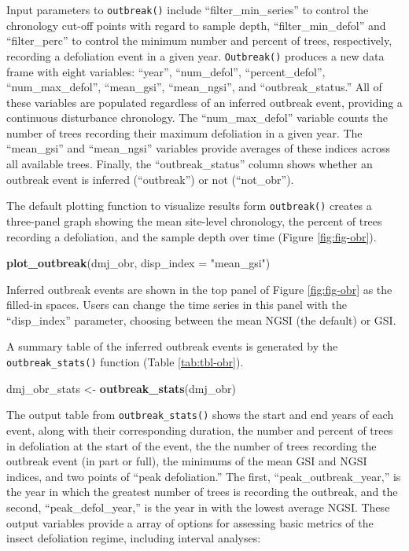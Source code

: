 \documentclass[review]{elsarticle} %
\newenvironment{Shaded}{\begin{snugshade}}{\end{snugshade}}
\newcommand{\DataTypeTok}[1]{\textcolor[rgb]{0.13,0.29,0.53}{#1}}
\newcommand{\KeywordTok}[1]{\textcolor[rgb]{0.13,0.29,0.53}{\textbf{#1}}}
\newcommand{\NormalTok}[1]{#1}
\newcommand{\StringTok}[1]{\textcolor[rgb]{0.31,0.60,0.02}{#1}}
\begin{document}
Input parameters to \texttt{outbreak()} include ``filter\_min\_series'' to control the chronology cut-off points with regard to sample depth, ``filter\_min\_defol'' and ``filter\_perc'' to control the minimum number and percent of trees, respectively, recording a defoliation event in a given year. \texttt{Outbreak()} produces a new data frame with eight variables: ``year'', ``num\_defol'', ``percent\_defol'', ``num\_max\_defol'', ``mean\_gsi'', ``mean\_ngsi'', and ``outbreak\_status.'' All of these variables are populated regardless of an inferred outbreak event, providing a continuous disturbance chronology. The ``num\_max\_defol'' variable counts the number of trees recording their maximum defoliation in a given year. The ``mean\_gsi'' and ``mean\_ngsi'' variables provide averages of these indices across all available trees. Finally, the ``outbreak\_status'' column shows whether an outbreak event is inferred (``outbreak'') or not (``not\_obr'').

The default plotting function to visualize results form \texttt{outbreak()} creates a three-panel graph showing the mean site-level chronology, the percent of trees recording a defoliation, and the sample depth over time (Figure \ref{fig:fig-obr}).

\begin{Shaded}
\begin{Highlighting}[]
\KeywordTok{plot_outbreak}\NormalTok{(dmj_obr, }\DataTypeTok{disp_index =} \StringTok{"mean_gsi"}\NormalTok{)}
\end{Highlighting}
\end{Shaded}

Inferred outbreak events are shown in the top panel of Figure \ref{fig:fig-obr} as the filled-in spaces. Users can change the time series in this panel with the ``disp\_index'' parameter, choosing between the mean NGSI (the default) or GSI.

A summary table of the inferred outbreak events is generated by the \texttt{outbreak\_stats()} function (Table \ref{tab:tbl-obr}).

\begin{Shaded}
\begin{Highlighting}[]
\NormalTok{dmj_obr_stats <-}\StringTok{ }\KeywordTok{outbreak_stats}\NormalTok{(dmj_obr)}
\end{Highlighting}
\end{Shaded}

The output table from \texttt{outbreak\_stats()} shows the start and end years of each event, along with their corresponding duration, the number and percent of trees in defoliation at the start of the event, the the number of trees recording the outbreak event (in part or full), the minimums of the mean GSI and NGSI indices, and two points of ``peak defoliation.'' The first, ``peak\_outbreak\_year,'' is the year in which the greatest number of trees is recording the outbreak, and the second, ``peak\_defol\_year,'' is the year in with the lowest average NGSI. These output variables provide a array of options for assessing basic metrics of the insect defoliation regime, including interval analyses:
\end{document}
